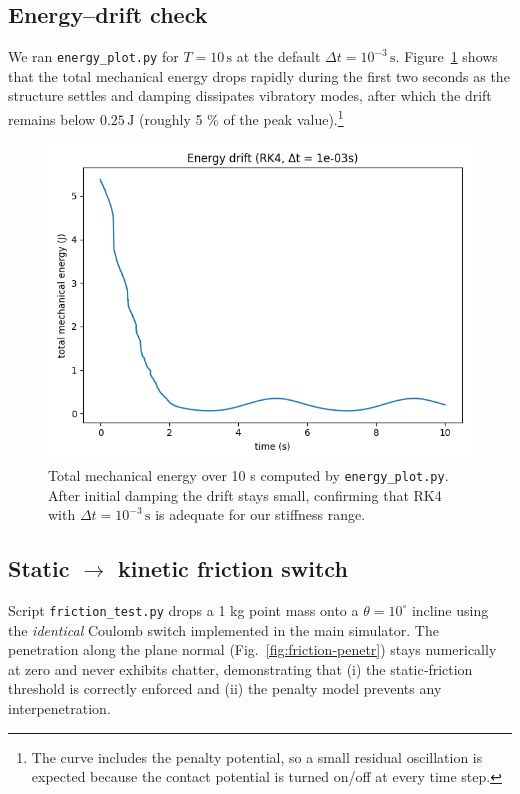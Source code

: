 \documentclass[12pt,letterpaper]{article}
\begin{document}
\subsection{Energy–drift check}
We ran \texttt{energy\_plot.py} for \(T=10\,\text{s}\) at the default
\(\Delta t=10^{-3}\,\text{s}\).
Figure~\ref{fig:energy‑drift} shows that the total mechanical energy
drops rapidly during the first two seconds as the structure settles and
damping dissipates vibratory modes, after which the drift remains below
\(0.25\,\text{J}\) (roughly 5 \% of the peak value).\footnote{The curve
includes the penalty potential, so a small residual oscillation is
expected because the contact potential is turned on/off at every time
step.}

\begin{figure}[H]
    \centering
    \includegraphics[width=0.70\linewidth]{energy_drift.png}
    \caption{Total mechanical energy over 10 s computed by
      \texttt{energy\_plot.py}.  After initial damping the drift stays
      small, confirming that RK4 with \(\Delta t=10^{-3}\,\text{s}\) is
      adequate for our stiffness range.}
    \label{fig:energy‑drift}
\end{figure}

\subsection{Static $\rightarrow$ kinetic friction switch}
Script \texttt{friction\_test.py} drops a 1 kg point mass onto a
\(\theta=10^{\circ}\) incline using the \emph{identical} Coulomb switch
implemented in the main simulator.
The penetration along the plane normal (Fig.~\ref{fig:friction‑penetr})
stays numerically at zero and never exhibits chatter, demonstrating that
(i) the static‐friction threshold is correctly enforced and
(ii) the penalty model prevents any interpenetration.
\end{document}
